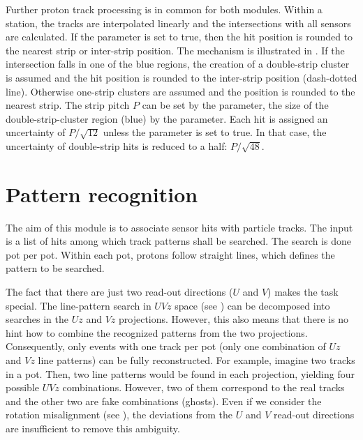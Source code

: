Further proton track processing is in common for both modules. Within a station, the tracks are interpolated linearly and the intersections with all sensors are calculated. If the  parameter is set to true, then the hit position is rounded to the nearest strip or inter-strip position. The mechanism is illustrated in . If the intersection falls in one of the blue regions, the creation of a double-strip cluster is assumed and the hit position is rounded to the inter-strip position (dash-dotted line). Otherwise one-strip clusters are assumed and the position is rounded to the nearest strip. The strip pitch $P$ can be set by the  parameter, the size of the double-strip-cluster region (blue) by the  parameter. Each hit is assigned an uncertainty of $P/\sqrt{12}$ unless the  parameter is set to true. In that case, the uncertainty of double-strip hits is reduced to a half: $P/\sqrt{48}$.



\section[pattern reco]{Pattern recognition}

The aim of this module is to associate sensor hits with particle tracks. The input is a list of  hits among which track patterns shall be searched. The search is done pot per pot. Within each pot, protons follow straight lines, which defines the pattern to be searched.

The fact that there are just two read-out directions ($U$ and $V$) makes the task special. The line-pattern search in $UVz$ space (see ) can be decomposed into searches in the $Uz$ and $Vz$ projections. However, this also means that there is no hint how to combine the recognized patterns from the two projections. Consequently, only events with one track per pot (only one combination of $Uz$ and $Vz$ line patterns) can be fully reconstructed. For example, imagine two tracks in a pot. Then, two line patterns would be found in each projection, yielding four possible $UVz$ combinations. However, two of them correspond to the real tracks and the other two are fake combinations (ghosts). Even if we consider the rotation misalignment (see ), the deviations from the $U$ and $V$ read-out directions are insufficient to remove this ambiguity. 

